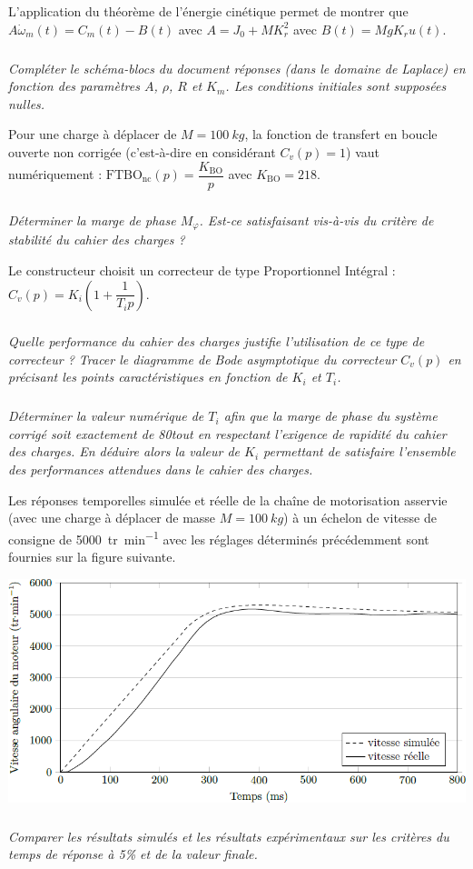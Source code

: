 \documentclass[10pt,fleqn]{article} %
\begin{document}
\begin{multicols}{2}
L'application du théorème de l'énergie cinétique permet de montrer que $A\dot{\omega}_m(t)=C_m(t)-B(t)$ avec $A=J_0+MK_r^2$ avec $B(t)=MgK_r u(t)$.

\subparagraph{}
\textit{Compléter le schéma-blocs du document réponses (dans le domaine de Laplace) en fonction des paramètres $A$, $\rho$, $R$ et $K_m$. Les conditions initiales sont supposées nulles.}

Pour une charge à déplacer de $M=\SI{100}{kg}$, la fonction de transfert en boucle ouverte non corrigée (c’est-à-dire en considérant $C_v(p)=1$) vaut numériquement : $\text{FTBO}_{\text{nc}}(p)=\dfrac{K_{\text{BO}}}{p}$ avec $K_{\text{BO}}=218$.

\subparagraph{}
\textit{Déterminer la marge de phase $M_{\varphi}$. Est-ce satisfaisant vis-à-vis du critère de stabilité du cahier des charges ?}

Le constructeur choisit un correcteur de type Proportionnel Intégral : $C_v(p)= K_i\left(1+ \dfrac{1}{T_i p}\right)$.

\subparagraph{}
\textit{Quelle performance du cahier des charges justifie l’utilisation de ce type de correcteur ? Tracer le diagramme de Bode asymptotique du correcteur $C_v(p)$ en précisant les points caractéristiques en fonction de $K_i$ et $T_i$.}


\subparagraph{}
\textit{Déterminer la valeur numérique de $T_i$ afin que la marge de phase du système corrigé soit exactement de 80\degres  tout en respectant l’exigence de rapidité du cahier des charges. En déduire alors la valeur de $K_i$ permettant
de satisfaire l’ensemble des performances attendues dans le cahier des charges.}


Les réponses temporelles simulée et réelle de la chaîne de motorisation asservie (avec une charge à déplacer de masse $M=\SI{100}{kg}$) à un échelon de vitesse de consigne de \SI{5 000}{tr.min^{-1}} avec les réglages déterminés
précédemment sont fournies sur la figure suivante.


\begin{center}
\includegraphics[width=\linewidth]{images/fig_03}
\end{center}

\subparagraph{}
\textit{Comparer les résultats simulés et les résultats expérimentaux sur les critères du temps de réponse à 5\%
et de la valeur finale.}



\end{multicols}
\end{document}
